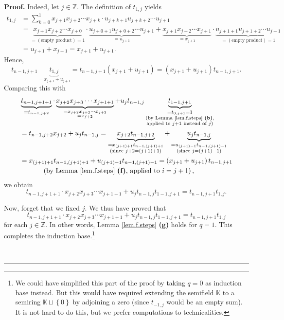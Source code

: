 \documentclass[numbers=enddot,12pt,final,onecolumn,notitlepage]{scrartcl}%
\theoremstyle{definition}
\newenvironment{proof}[1][Proof]{\noindent\textbf{#1.} }{\ \rule{0.5em}{0.5em}}
\let\sumnonlimits\sum
\renewcommand{\sum}{\sumnonlimits\limits}
\newenvironment{verlong}{}{}
\begin{document}
\begin{proof}
\begin{verlong}
Indeed, let $j\in\mathbb{Z}$. The definition of $t_{1,j}$ yields%
\begin{align*}
t_{1,j}  &  =\sum_{k=0}^{1}x_{j+1}x_{j+2}\cdots x_{j+k}\cdot u_{j+k+1}%
u_{j+k+2}\cdots u_{j+1}\\
&  =\underbrace{x_{j+1}x_{j+2}\cdots x_{j+0}}_{=\left(  \text{empty
product}\right)  =1}\cdot\underbrace{u_{j+0+1}u_{j+0+2}\cdots u_{j+1}%
}_{=u_{j+1}}+\underbrace{x_{j+1}x_{j+2}\cdots x_{j+1}}_{=x_{j+1}}%
\cdot\underbrace{u_{j+1+1}u_{j+1+2}\cdots u_{j+1}}_{=\left(  \text{empty
product}\right)  =1}\\
&  =u_{j+1}+x_{j+1}=x_{j+1}+u_{j+1}.
\end{align*}
Hence,%
\[
t_{n-1,j+1}\underbrace{t_{1,j}}_{=x_{j+1}+u_{j+1}}=t_{n-1,j+1}\left(
x_{j+1}+u_{j+1}\right)  =\left(  x_{j+1}+u_{j+1}\right)  t_{n-1,j+1}.
\]
Comparing this with%
\begin{align*}
&  \underbrace{t_{n-1,j+1+1}}_{=t_{n-1,j+2}}\cdot\underbrace{x_{j+2}%
x_{j+3}\cdots x_{j+1+1}}_{\substack{=x_{j+2}x_{j+3}\cdots x_{j+2}\\=x_{j+2}%
}}+u_{j}t_{n-1,j}\underbrace{t_{1-1,j+1}}_{\substack{=t_{0,j+1}=1\\\text{(by
Lemma \ref{lem.f.steps} \textbf{(b)},}\\\text{applied to }j+1\text{ instead of
}j\text{)}}}\\
&  =t_{n-1,j+2}x_{j+2}+u_{j}t_{n-1,j}=\underbrace{x_{j+2}t_{n-1,j+2}%
}_{\substack{=x_{\left(  j+1\right)  +1}t_{n-1,\left(  j+1\right)
+1}\\\text{(since }j+2=\left(  j+1\right)  +1\text{)}}}+\underbrace{u_{j}%
t_{n-1,j}}_{\substack{=u_{\left(  j+1\right)  -1}t_{n-1,\left(  j+1\right)
-1}\\\text{(since }j=\left(  j+1\right)  -1\text{)}}}\\
&  =x_{\left(  j+1\right)  +1}t_{n-1,\left(  j+1\right)  +1}+u_{\left(
j+1\right)  -1}t_{n-1,\left(  j+1\right)  -1}=\left(  x_{j+1}+u_{j+1}\right)
t_{n-1,j+1}\\
&  \ \ \ \ \ \ \ \ \ \ \left(  \text{by Lemma \ref{lem.f.steps} \textbf{(f)},
applied to }i=j+1\right)  ,
\end{align*}
we obtain
\[
t_{n-1,j+1+1}\cdot x_{j+2}x_{j+3}\cdots x_{j+1+1}+u_{j}t_{n-1,j}%
t_{1-1,j+1}=t_{n-1,j+1}t_{1,j}.
\]

\end{verlong}

Now, forget that we fixed $j$. We thus have proved that%
\[
t_{n-1,j+1+1}\cdot x_{j+2}x_{j+3}\cdots x_{j+1+1}+u_{j}t_{n-1,j}%
t_{1-1,j+1}=t_{n-1,j+1}t_{1,j}%
\]
for each $j\in\mathbb{Z}$. In other words, Lemma \ref{lem.f.steps}
\textbf{(g)} holds for $q=1$. This completes the induction base.\footnote{We
could have simplified this part of the proof by taking $q=0$ as induction base
instead. But this would have required extending the semifield $\mathbb{K}$ to
a semiring $\mathbb{K}\sqcup\left\{  0\right\}  $ by adjoining a zero (since
$t_{-1,j}$ would be an empty sum). It is not hard to do this, but we prefer
computations to technicalities.}


\end{proof}
\end{document}
